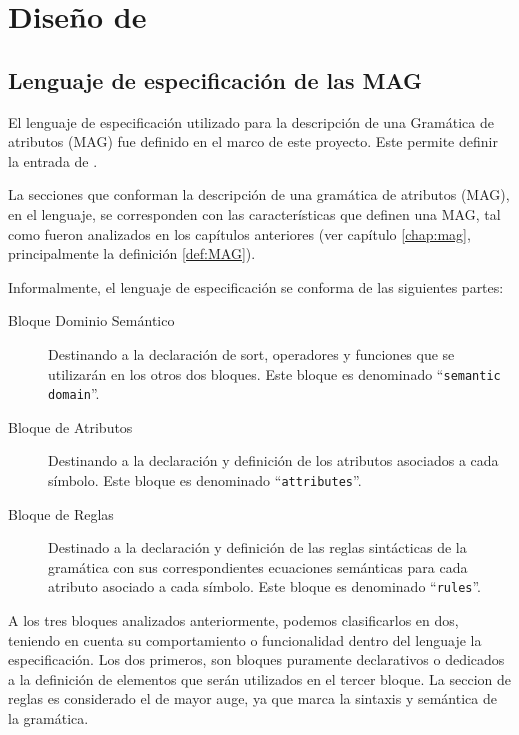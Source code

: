 \chapter{Diseño de \maggen}
\label{chap:disen_}
\minitoc

\section{Lenguaje de especificación de las MAG}
\label{sec:lenguajeMAG}

El lenguaje de especificación utilizado para la descripción de una Gramática de atributos (MAG) fue definido en el marco de este proyecto. Este permite definir la entrada de \maggen.
 
La secciones que conforman la descripción de una gramática de atributos (MAG), en el lenguaje, se corresponden con las características que definen una MAG, tal como fueron analizados en los capítulos anteriores (ver capítulo \ref{chap:mag}, principalmente la definición \ref{def:MAG}).
 
Informalmente, el lenguaje de especificación se conforma de las siguientes partes:

\begin{description}
\item [Bloque Dominio Semántico] Destinando a la declaración de sort, operadores y funciones que se utilizarán en los otros dos bloques. Este bloque es denominado ``\texttt{semantic domain}''.

\item [Bloque de Atributos] Destinando a la declaración y definición de los atributos asociados a cada símbolo. Este bloque es denominado ``\texttt{attributes}''.

\item [Bloque de Reglas] Destinado a la declaración y definición de las reglas sintácticas de la gramática con sus correspondientes ecuaciones semánticas para cada atributo asociado a cada símbolo. Este bloque es denominado ``\texttt{rules}''.
\end{description}

A los tres bloques analizados anteriormente, podemos clasificarlos en dos, teniendo en cuenta su comportamiento o funcionalidad dentro del lenguaje la especificación. Los dos primeros, son bloques puramente declarativos o dedicados a la definición de elementos que serán utilizados en el tercer bloque. La seccion de reglas es considerado el de mayor auge, ya que marca la sintaxis y semántica de la gramática.

